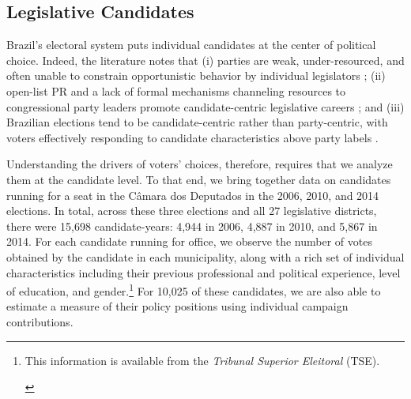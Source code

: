 \documentclass[12pt,english]{article}
\newcommand{\note}[1]{\footnote{ \begin{doublespace}#1  \end{doublespace}}}
\numberwithin{equation}{section}
\theoremstyle{plain}
\theoremstyle{remark}
\theoremstyle{plain}
\newcommand{\red}[1]{\textcolor{red}{#1}}
\begin{document}
\subsection{Legislative Candidates  \label{candidates}}


Brazil's electoral system puts individual candidates at the center of political choice. Indeed, the literature notes that (i) parties are weak, under-resourced, and often unable to constrain opportunistic behavior by individual legislators \cite{Samuels2003,Desposato2006,KlavsnjaTitiunik2017}; (ii) open-list PR and a lack of formal mechanisms channeling resources to congressional party leaders promote candidate-centric legislative careers \cite{Mainwaring1995,Samuels2003}; and (iii) %
Brazilian elections tend to be candidate-centric rather than party-centric, with voters effectively responding to candidate characteristics above party labels \cite{Mainwaring1995,Samuels2003,KlavsnjaTitiunik2017}.

Understanding the drivers of voters' choices, therefore, requires that we analyze them at the candidate level. %
To that end, we bring together data on candidates running for a seat in the C\^{a}mara dos Deputados in the 2006, 2010, and 2014 elections. In total, across these three elections and all 27 legislative districts, there were 15,698 candidate-years: 4,944 in 2006, 4,887 in 2010, and 5,867 in 2014.  For each candidate running for office, we observe the number of votes obtained by the candidate in each municipality, along with a %
 rich set of individual characteristics including their previous professional and political experience, level of education, and gender.\note{\normalsize This information is available from the \emph{Tribunal Superior Eleitoral} (TSE).} %
For 10,025 of these candidates, we are also able to estimate a measure of their policy positions using individual campaign contributions.
\end{document}
